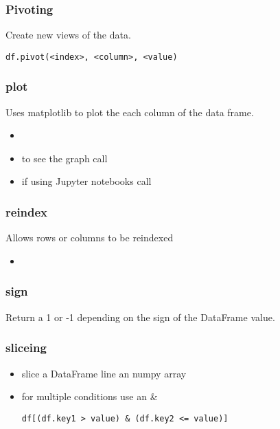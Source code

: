 %
\subsubsection{Pivoting}
Create new views of the data.

\begin{lstlisting}
df.pivot(<index>, <column>, <value)
\end{lstlisting}
%
\subsubsection{plot}
Uses matplotlib to plot the each column of the data frame.
  \begin{itemize}

    \item {\color{red}{make sure to import matplotlib before calling this
      method}}

    \item to see the graph call {\color{red}{plt.show()}}

    \item if using Jupyter notebooks call {\color{red}{\%matplotlib inline}}
  \end{itemize}

%
\subsubsection{reindex}
Allows rows or columns to be reindexed
  \begin{itemize}

    \item \color{red}{if no arguments are passed the rows will be reindexed,
      and if the columns argument is passed the columns will be reindexed.}
  \end{itemize}

%
\subsubsection{sign}
Return a 1 or -1 depending on the sign of the DataFrame value.

%
\subsubsection{sliceing}
  \begin{itemize}
    \item slice a DataFrame line an numpy array
    \item for multiple conditions use an \&
\begin{lstlisting}
df[(df.key1 > value) & (df.key2 <= value)]
\end{lstlisting}
  \end{itemize}

